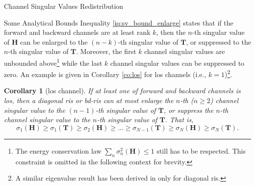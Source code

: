 \documentclass[journal]{IEEEtran}
\newtheorem{corollary}{Corollary}[proposition]
\begin{document}
\begin{section}{Channel Singular Values Redistribution}
\begin{subsection}{Some Analytical Bounds}
		Inequality \eqref{iq:sv_bound_enlarge} states that
		if the forward and backward channels are at least rank $k$, then
		the $n$-th singular value of $\mathbf{H}$ can be enlarged to the $(n-k)$-th singular value of $\mathbf{T}$, or suppressed to the $n$-th singular value of $\mathbf{T}$.
		Moreover, the first $k$ channel singular values are unbounded above\footnote{The energy conservation law $\sum_n \sigma_n^2(\mathbf{H}) \le 1$ still has to be respected. This constraint is omitted in the following context for brevity.} while the last $k$ channel singular values can be suppressed to zero.
		An example is given in Corollary \ref{co:los} for \gls{los} channels (i.e., $k=1$)\footnote{A similar eigenvalue result has been derived in \cite{Semmler2023} only for diagonal \gls{ris}.}.





		\begin{corollary}[\gls{los} channel\label{co:los}]
			If at least one of forward and backward channels is \gls{los}, then a diagonal \gls{ris} or \gls{bd}-\gls{ris} can at most enlarge the $n$-th ($n \ge 2$) channel singular value to the $(n-1)$-th singular value of $\mathbf{T}$, or suppress the $n$-th channel singular value to the $n$-th singular value of $\mathbf{T}$.
			That is,
			\begin{equation}
				\sigma_1(\mathbf{H}) \ge \sigma_1(\mathbf{T}) \ge {\sigma_2(\mathbf{H})} \ge \ldots \ge \sigma_{N-1}(\mathbf{T}) \ge {\sigma_N(\mathbf{H})} \ge \sigma_N(\mathbf{T}).
				\label{iq:sv_bound_los}
			\end{equation}
		\end{corollary}


\end{subsection}
\end{section}
\end{document}
